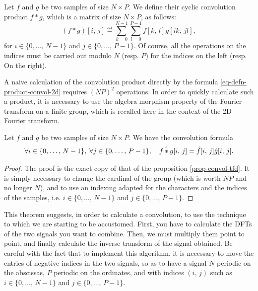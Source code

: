 \begin{defn}
Let $ f $ and $ g $ be two samples of size $ N \times P $. We define their cyclic convolution product $ f * g $, which is a matrix of size $ N \times P $, as follows:
\begin{equation}
\label{eq-defn-product-convol-2d}
(f * g) [i, \, j] \eqdef \sum_{k = 0}^{N-1}{\sum_{l = 0}^{P-1}{f[k, \, l] g [ik, \, jl]}},
\end{equation}
for $ i \in \{0, \ldots, \, N-1\} $ and $ j \in \{0, \ldots, \, P-1\} $. Of course, all the operations on the indices must be carried out modulo $N$ (resp. $ P $) for the indices on the left (resp. On the right).
\end{defn}
 
 
 
A naive calculation of the convolution product directly by the formula \eqref{eq-defn-product-convol-2d} requires $ (NP)^2 $ operations. In order to quickly calculate such a product, it is necessary to use the algebra morphism property of the Fourier transform on a finite group, which is recalled here in the context of the 2D Fourier transform.
 
\begin{prop}
\label{prop-convol-tfd-2d}
Let $ f $ and $ g $ be two samples of size $ N \times P $. We have the convolution formula
\begin{equation}
\label{eq-formula-convolution-tfd-2d}
\forall i \in \{0, \ldots, \, N-1\}, \; \forall j \in \{0, \ldots, \, P-1\}, \quad \hat{f * g}[i, \, j] = \hat{f}[i, \, j] \hat{g}[i, \, j].
\end{equation}
\end{prop}
\begin{proof}
The proof is the exact copy of that of the proposition \ref{prop-convol-tfd}. It is simply necessary to change the cardinal of the group (which is worth $ NP $ and no longer $N$), and to use an indexing adapted for the characters and the indices of the samples, i.e. $ i \in \{0, \ldots, \, N-1\} $ and $ j \in \{0, \ldots, \, P-1\} $.
\end{proof}
This theorem suggests, in order to calculate a convolution, to use the technique to which we are starting to be accustomed. First, you have to calculate the DFTs of the two signals you want to combine. Then, we must multiply them point to point, and finally calculate the inverse transform of the signal obtained. Be careful with the fact that to implement this algorithm, it is necessary to move the entries of negative indices in the two signals, so as to have a signal $N$ periodic on the abscissas, $ P $ periodic on the ordinates, and with indices $ (i, \, j) $ such as $ i \in \{0, \ldots, \, N-1\} $ and $ j \in \{0, \ldots, \, P-1\} $.
 
